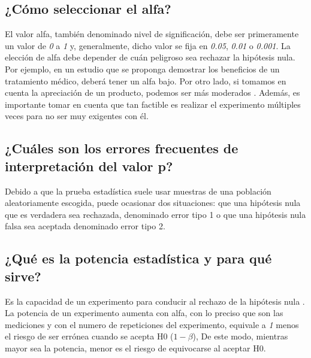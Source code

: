 \documentclass[]{article}
\begin{document}
\subsection{¿Cómo seleccionar el alfa?}
El valor alfa, también denominado nivel de significación, debe ser primeramente un valor de \textit{0} a \textit{1} y, generalmente, dicho valor se fija en \textit{0.05}, \textit{0.01} o \textit{0.001}.
La elección de alfa debe depender de cuán peligroso sea rechazar la hipótesis nula. Por ejemplo, en un estudio que se proponga demostrar los beneficios de un tratamiento médico, deberá tener un alfa bajo. Por otro lado, si tomamos en cuenta la apreciación de un producto, podemos ser más moderados \cite{Articulo_1}. Además, es importante tomar en cuenta que tan factible es realizar el experimento múltiples veces para no ser muy exigentes con él.

\subsection{¿Cuáles son los errores frecuentes de interpretación del valor p?}
Debido a que la prueba estadística suele usar muestras de una población aleatoriamente escogida, puede ocasionar dos situaciones: que una hipótesis nula que es verdadera sea rechazada, denominado error tipo 1 o que una hipótesis nula falsa sea aceptada denominado error tipo 2.

\subsection{¿Qué es la potencia estadística y para qué sirve?}
Es la capacidad de un experimento para conducir al rechazo de la hipótesis nula \cite{Articulo_1}. La potencia de un experimento aumenta con alfa, con lo preciso que son las mediciones y con el numero de repeticiones del experimento, equivale a \textit{1} menos el riesgo de ser errónea cuando se acepta H0 (\textit{$1 - \beta $}), De este modo, mientras mayor sea la potencia, menor es el riesgo de equivocarse al aceptar H0.
\end{document}
